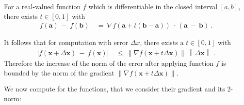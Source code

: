\documentclass{article}
\newcommand\Ba{\bm{a}}
\newcommand\Bb{\bm{b}}
\newcommand\Bx{\bm{x}}
\renewcommand{\leq}{\leqslant}
\begin{document}
\begin{lemma}
\label{th:mvt}
For a real-valued function $f$ which is differentiable in the closed interval $[a,b]$,
there exists $t \in [0,1]$ with 
\begin{align}
f(\Ba) \ - \ f(\Bb) \ &= \ \nabla f(\Ba+t (\Bb -\Ba)) \ \cdot \ ( \Ba \ - \ \Bb) \ .
\end{align}
\end{lemma}
It follows that 
for computation with error $\Delta x$, there exists a $t \in [0,1]$ with 
\begin{align}
\left| f(\Bx+\Delta \Bx) \ - \ f(\Bx) \right| \ &\leq \ \left\| \nabla
                                                  f(\Bx+t \Delta \Bx)\right\| \ \left\|
                                            \Delta \Bx \right\| \ .
\end{align}
Therefore the increase of the norm of the error after applying
function $f$ is bounded by the norm of the gradient
$\left\| \nabla f(\Bx+t \Delta \Bx)\right\|$.


We now compute for the functions, that we consider their gradient and
its 2-norm:  
\end{document}
